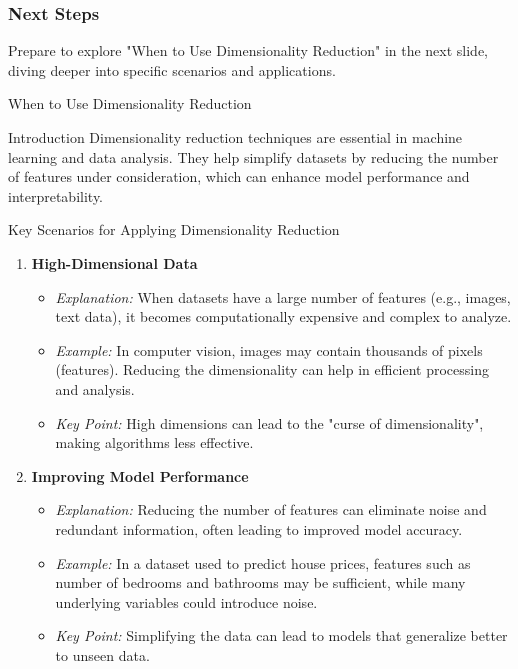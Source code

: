 \documentclass[aspectratio=169]{beamer}
\begin{document}
\begin{frame}[fragile]
    \frametitle{Next Steps}
    Prepare to explore "When to Use Dimensionality Reduction" in the next slide, diving deeper into specific scenarios and applications.
\end{frame}

\begin{frame}[fragile]{When to Use Dimensionality Reduction}
    \begin{block}{Introduction}
        Dimensionality reduction techniques are essential in machine learning and data analysis. They help simplify datasets by reducing the number of features under consideration, which can enhance model performance and interpretability.
    \end{block}
\end{frame}

\begin{frame}[fragile]{Key Scenarios for Applying Dimensionality Reduction}
    \begin{enumerate}
        \item \textbf{High-Dimensional Data}
            \begin{itemize}
                \item \textit{Explanation:} When datasets have a large number of features (e.g., images, text data), it becomes computationally expensive and complex to analyze.
                \item \textit{Example:} In computer vision, images may contain thousands of pixels (features). Reducing the dimensionality can help in efficient processing and analysis.
                \item \textit{Key Point:} High dimensions can lead to the "curse of dimensionality", making algorithms less effective.
            \end{itemize}
        
        \item \textbf{Improving Model Performance}
            \begin{itemize}
                \item \textit{Explanation:} Reducing the number of features can eliminate noise and redundant information, often leading to improved model accuracy.
                \item \textit{Example:} In a dataset used to predict house prices, features such as number of bedrooms and bathrooms may be sufficient, while many underlying variables could introduce noise.
                \item \textit{Key Point:} Simplifying the data can lead to models that generalize better to unseen data.
            \end{itemize}
    \end{enumerate}
\end{frame}
\end{document}
